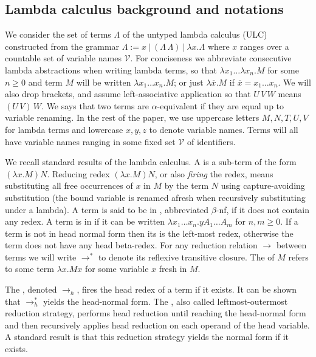 \documentclass{elsarticle}
\theoremstyle{plain}
\theoremstyle{definition}
\newcommand\VarSet{\mathcal{V}}
\begin{document}
\subsection{Lambda calculus background and notations}
\label{sec:lambdacalculus_basics}

We consider the set of terms $\Lambda$ of the untyped lambda calculus (ULC) constructed from the grammar $\Lambda := x\ |\ (\Lambda\, \Lambda)\ |\ \lambda x. \Lambda $
where $x$ ranges over a countable set of variable names $\VarSet$.
For conciseness we abbreviate consecutive lambda abstractions when writing lambda terms, so that $\lambda x_1 \ldots \lambda x_n . M$ for some $n\geq 0$ and term $M$ will be written $\lambda x_1 \ldots x_n . M$; or just
$\lambda \overline{x} . M$ if $\overline{x} = x_1 \ldots x_n$.
We will also drop brackets, and assume left-associative application so that $U\,V\,W$ means $(U\,V)\,W$. We says that two terms are $\alpha$-equivalent if they are equal up to variable renaming.
In the rest of the paper, we use uppercase letters $M, N, T, U, V$ for lambda terms and lowercase $x,y,z$ to denote variable names. Terms will all have variable names ranging in some fixed set $\VarSet$ of identifiers.

We recall standard results of the lambda calculus.
A  is a sub-term of the form $(\lambda x. M) N$.
Reducing redex $(\lambda x. M) N$, or also \emph{firing} the redex, means substituting all free occurrences of $x$ in $M$ by the term $N$
using capture-avoiding substitution (the bound variable is renamed afresh when recursively substituting under a lambda).
A term is said to be in , abbreviated $\beta$-nf, if it does not contain any redex.
A term is in  if it can be written $\lambda x_1 \ldots x_n . y A_1 \ldots A_m$ for $n,m\geq0$. If a term is not in head normal form then its  is the left-most redex, otherwise the term does not have any head beta-redex. For any reduction relation $\rightarrow$ between terms we will write $\rightarrow^*$ to denote its reflexive transitive closure. The  of $M$ refers to some term $\lambda x. M x $ for some variable $x$ fresh in $M$.

The , denoted $\rightarrow_{h}$, fires the head redex of a term if it exists. It can be shown that $\rightarrow^*_{h}$ yields the head-normal form. The , also called leftmost-outermost reduction strategy, performs head reduction until reaching the head-normal form and then recursively applies head reduction on each operand of the head variable. A standard result is that this reduction strategy yields the normal form if it exists.
\end{document}
